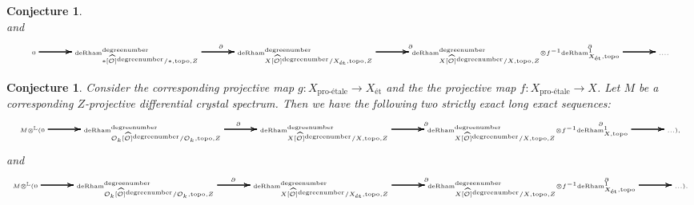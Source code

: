 \documentclass[11pt]{book}
\newtheorem{conjecture}[theorem]{Conjecture}
\theoremstyle{definition}
\numberwithin{equation}{section}
\begin{document}
\begin{landscape}
\begin{conjecture}
\[{}
\]
and
\[\tiny
\xymatrix@C+0.4pc@R+0pc{
0\ar[r]\ar[r]\ar[r] \ar[r] &\mathrm{deRham}^\text{degreenumber}_{*[\widehat{\mathcal{O}}]^\text{degreenumber}/*,\mathrm{topo},Z} \ar[r]^\partial\ar[r]\ar[r] \ar[r] &\mathrm{deRham}^\text{degreenumber}_{X[\widehat{\mathcal{O}}]^\text{degreenumber}/X_{\text{\'et}},\mathrm{topo},Z} \ar[r]^\partial\ar[r]\ar[r] \ar[r] &\mathrm{deRham}^\text{degreenumber}_{X[\widehat{\mathcal{O}}]^\text{degreenumber}/X,\mathrm{topo},Z}{\otimes}f^{-1} \mathrm{deRham}^1_{X_{\text{\'et}},\mathrm{topo}} \ar[r]^\partial\ar[r]\ar[r] \ar[r]&....
}
\]
\end{conjecture}







\begin{conjecture}
Consider the corresponding projective map $g:X_{\text{pro-\'etale}}\rightarrow X_{\text{\'et}}$ and the the projective map $f:X_{\text{pro-\'etale}}\rightarrow X$. Let $M$ be a corresponding $Z$-projective differential crystal spectrum. Then we have the following two strictly exact long exact sequences:
\[\tiny
\xymatrix@C+0.4pc@R+0pc{
M{\otimes}^\mathbb{L}(0\ar[r]\ar[r]\ar[r] \ar[r] &\mathrm{deRham}^\text{degreenumber}_{\mathcal{O}_k[\widehat{\mathcal{O}}]^\text{degreenumber}/\mathcal{O}_k,\mathrm{topo},Z} \ar[r]^\partial\ar[r]\ar[r] \ar[r] &\mathrm{deRham}^\text{degreenumber}_{X[\widehat{\mathcal{O}}]^\text{degreenumber}/X,\mathrm{topo},Z} \ar[r]^\partial\ar[r]\ar[r] \ar[r] &\mathrm{deRham}^\text{degreenumber}_{X[\widehat{\mathcal{O}}]^\text{degreenumber}/X,\mathrm{topo},Z}{\otimes}f^{-1} \mathrm{deRham}^1_{X,\mathrm{topo}} \ar[r]^\partial\ar[r]\ar[r] \ar[r] &...),
}
\]
and
\[\tiny
\xymatrix@C+0.4pc@R+0pc{
M{\otimes}^\mathbb{L}(0\ar[r]\ar[r]\ar[r] \ar[r] &\mathrm{deRham}^\text{degreenumber}_{\mathcal{O}_k[\widehat{\mathcal{O}}]^\text{degreenumber}/\mathcal{O}_k,\mathrm{topo},Z} \ar[r]^\partial\ar[r]\ar[r] \ar[r] &\mathrm{deRham}^\text{degreenumber}_{X[\widehat{\mathcal{O}}]^\text{degreenumber}/X_{\text{\'et}},\mathrm{topo},Z} \ar[r]^\partial\ar[r]\ar[r] \ar[r] &\mathrm{deRham}^\text{degreenumber}_{X[\widehat{\mathcal{O}}]^\text{degreenumber}/X,\mathrm{topo},Z}{\otimes}f^{-1} \mathrm{deRham}^1_{X_{\text{\'et}},\mathrm{topo}} \ar[r]^\partial\ar[r]\ar[r] \ar[r]&...).
}
\]
\end{conjecture}

\end{landscape}


\end{document}
